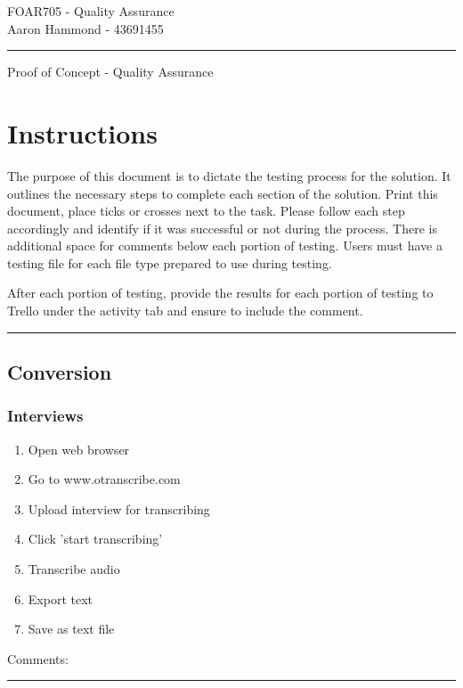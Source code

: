 \documentclass[11pt, a4paper,]{scrartcl}
\begin{document}

\begin{flushleft}{\footnotesize{}
FOAR705 - Quality Assurance\\
Aaron Hammond - 43691455
}
\end{flushleft}

\hrule
\begin{center}
\large{Proof of Concept - Quality Assurance}
\end{center}

\section{Instructions}
The purpose of this document is to dictate the testing process for the solution. It outlines the necessary steps to complete each section of the solution. Print this document, place ticks or crosses next to the task. Please follow each step accordingly and identify if it was successful or not during the process. There is additional space for comments below each portion of testing. Users must have a testing file for each file type prepared to use during testing.\par

After each portion of testing, provide the results for each portion of testing to Trello under the activity tab and ensure to include the comment.
\vspace{.7cm}
\hrule
\subsection{Conversion}
\subsubsection{Interviews}
\begin{enumerate}
    \item Open web browser
    \item Go to www.otranscribe.com
    \item Upload interview for transcribing
    \item Click 'start transcribing'
    \item Transcribe audio
    \item Export text
    \item Save as text file
\end{enumerate}
Comments:
\vspace{2cm}
\hrule
\end{document}
